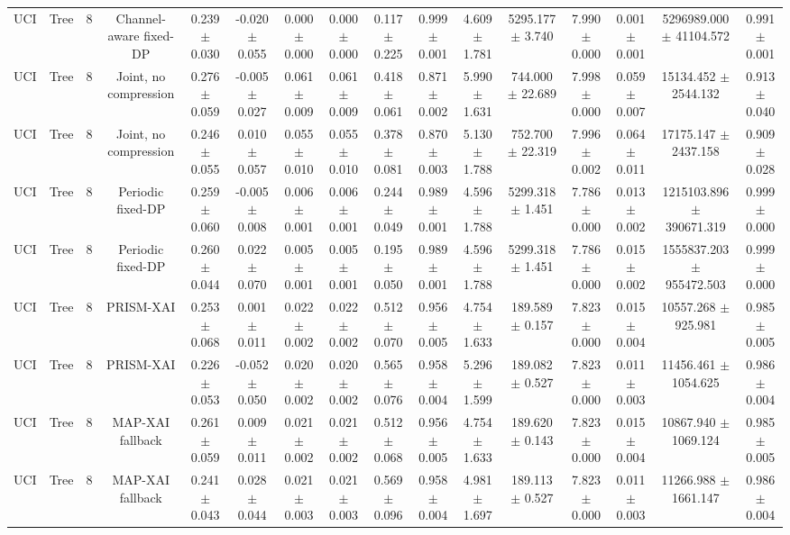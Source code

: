 \begin{tabular}{lccccccccccccccc}
UCI & Tree & 8 & Channel-aware fixed-DP & 0.239 $\pm$ 0.030 & -0.020 $\pm$ 0.055 & 0.000 $\pm$ 0.000 & 0.000 $\pm$ 0.000 & 0.117 $\pm$ 0.225 & 0.999 $\pm$ 0.001 & 4.609 $\pm$ 1.781 & 5295.177 $\pm$ 3.740 & 7.990 $\pm$ 0.000 & 0.001 $\pm$ 0.001 & 5296989.000 $\pm$ 41104.572 & 0.991 $\pm$ 0.001 \\
UCI & Tree & 8 & Joint, no compression & 0.276 $\pm$ 0.059 & -0.005 $\pm$ 0.027 & 0.061 $\pm$ 0.009 & 0.061 $\pm$ 0.009 & 0.418 $\pm$ 0.061 & 0.871 $\pm$ 0.002 & 5.990 $\pm$ 1.631 & 744.000 $\pm$ 22.689 & 7.998 $\pm$ 0.000 & 0.059 $\pm$ 0.007 & 15134.452 $\pm$ 2544.132 & 0.913 $\pm$ 0.040 \\
UCI & Tree & 8 & Joint, no compression & 0.246 $\pm$ 0.055 & 0.010 $\pm$ 0.057 & 0.055 $\pm$ 0.010 & 0.055 $\pm$ 0.010 & 0.378 $\pm$ 0.081 & 0.870 $\pm$ 0.003 & 5.130 $\pm$ 1.788 & 752.700 $\pm$ 22.319 & 7.996 $\pm$ 0.002 & 0.064 $\pm$ 0.011 & 17175.147 $\pm$ 2437.158 & 0.909 $\pm$ 0.028 \\
UCI & Tree & 8 & Periodic fixed-DP & 0.259 $\pm$ 0.060 & -0.005 $\pm$ 0.008 & 0.006 $\pm$ 0.001 & 0.006 $\pm$ 0.001 & 0.244 $\pm$ 0.049 & 0.989 $\pm$ 0.001 & 4.596 $\pm$ 1.788 & 5299.318 $\pm$ 1.451 & 7.786 $\pm$ 0.000 & 0.013 $\pm$ 0.002 & 1215103.896 $\pm$ 390671.319 & 0.999 $\pm$ 0.000 \\
UCI & Tree & 8 & Periodic fixed-DP & 0.260 $\pm$ 0.044 & 0.022 $\pm$ 0.070 & 0.005 $\pm$ 0.001 & 0.005 $\pm$ 0.001 & 0.195 $\pm$ 0.050 & 0.989 $\pm$ 0.001 & 4.596 $\pm$ 1.788 & 5299.318 $\pm$ 1.451 & 7.786 $\pm$ 0.000 & 0.015 $\pm$ 0.002 & 1555837.203 $\pm$ 955472.503 & 0.999 $\pm$ 0.000 \\
UCI & Tree & 8 & PRISM-XAI & 0.253 $\pm$ 0.068 & 0.001 $\pm$ 0.011 & 0.022 $\pm$ 0.002 & 0.022 $\pm$ 0.002 & 0.512 $\pm$ 0.070 & 0.956 $\pm$ 0.005 & 4.754 $\pm$ 1.633 & 189.589 $\pm$ 0.157 & 7.823 $\pm$ 0.000 & 0.015 $\pm$ 0.004 & 10557.268 $\pm$ 925.981 & 0.985 $\pm$ 0.005 \\
UCI & Tree & 8 & PRISM-XAI & 0.226 $\pm$ 0.053 & -0.052 $\pm$ 0.050 & 0.020 $\pm$ 0.002 & 0.020 $\pm$ 0.002 & 0.565 $\pm$ 0.076 & 0.958 $\pm$ 0.004 & 5.296 $\pm$ 1.599 & 189.082 $\pm$ 0.527 & 7.823 $\pm$ 0.000 & 0.011 $\pm$ 0.003 & 11456.461 $\pm$ 1054.625 & 0.986 $\pm$ 0.004 \\
UCI & Tree & 8 & MAP-XAI fallback & 0.261 $\pm$ 0.059 & 0.009 $\pm$ 0.011 & 0.021 $\pm$ 0.002 & 0.021 $\pm$ 0.002 & 0.512 $\pm$ 0.068 & 0.956 $\pm$ 0.005 & 4.754 $\pm$ 1.633 & 189.620 $\pm$ 0.143 & 7.823 $\pm$ 0.000 & 0.015 $\pm$ 0.004 & 10867.940 $\pm$ 1069.124 & 0.985 $\pm$ 0.005 \\
UCI & Tree & 8 & MAP-XAI fallback & 0.241 $\pm$ 0.043 & 0.028 $\pm$ 0.044 & 0.021 $\pm$ 0.003 & 0.021 $\pm$ 0.003 & 0.569 $\pm$ 0.096 & 0.958 $\pm$ 0.004 & 4.981 $\pm$ 1.697 & 189.113 $\pm$ 0.527 & 7.823 $\pm$ 0.000 & 0.011 $\pm$ 0.003 & 11266.988 $\pm$ 1661.147 & 0.986 $\pm$ 0.004 \\
\bottomrule
\end{tabular}
